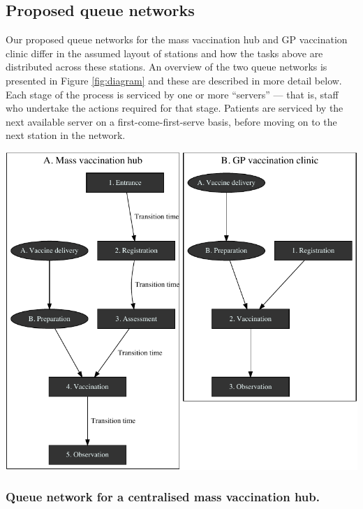 \documentclass{article}
\let\origfigure\figure
\let\endorigfigure\endfigure
\renewenvironment{figure}[1][2] {
    \expandafter\origfigure\expandafter[H]
} {
    \endorigfigure
}
\begin{document}
\hypertarget{proposed-queue-networks}{%
\subsection{Proposed queue networks}\label{proposed-queue-networks}}

Our proposed queue networks for the mass vaccination hub and GP
vaccination clinic differ in the assumed layout of stations and how the
tasks above are distributed across these stations. An overview of the
two queue networks is presented in Figure \ref{fig:diagram} and these
are described in more detail below. Each stage of the process is
serviced by one or more ``servers'' --- that is, staff who undertake the
actions required for that stage. Patients are serviced by the next
available server on a first-come-first-serve basis, before moving on to
the next station in the network.

\begin{figure}

{\centering \includegraphics{Preprint_files/figure-latex/diagram-1} 

}

\caption{Queueing model for arena vaccination site (A) and GP vaccination site (B)}\label{fig:diagram}
\end{figure}

\hypertarget{queue-network-for-a-centralised-mass-vaccination-hub.}{%
\subsubsection{Queue network for a centralised mass vaccination
hub.}\label{queue-network-for-a-centralised-mass-vaccination-hub.}}
\end{document}
